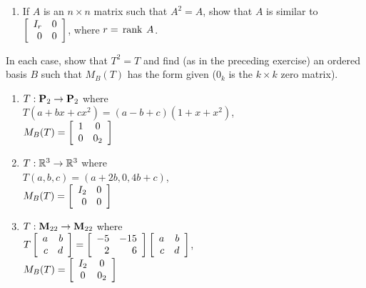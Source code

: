 \begin{multicols}{2}
\begin{ex}
\begin{enumerate}[label={\alph*.}]
\item If $A$ is an $n \times n$ matrix such that $A^{2} = A$, show that $A$ is similar to $\left[ \begin{array}{rr} I_r & 0 \\ 0 & 0 \end{array} \right]$, where $r = \thinspace\operatorname{rank \medspace}A$. 

\end{enumerate}
\end{ex}

\begin{ex}
In each case, show that $T^{2} = T$ and find (as in the preceding exercise) an ordered basis $B$ such that $M_{B}(T)$ has the form given ($0_{k}$ is the $k \times k$ zero matrix).


\begin{enumerate}[label={\alph*.}]
\item $T : \textbf{P}_2 \to \textbf{P}_2$ where\\ $T(a + bx + cx^2) = (a - b + c)(1 + x + x^2)$, \\ $M_B(T) = \left[ \begin{array}{cc} 1 & 0 \\ 0 & 0_2 \end{array} \right]$


\item $T : \mathbb{R}^3 \to \mathbb{R}^3$ where \\$T(a, b, c) = (a + 2b, 0, 4b + c)$, \\ $M_B(T) = \left[ \begin{array}{rr} I_2 & 0 \\ 0 & 0 \end{array} \right]$


\item $T : \textbf{M}_{22} \to \textbf{M}_{22}$ where \\$T\left[ \begin{array}{rr} a & b \\ c & d \end{array} \right] = \left[ \begin{array}{rr} -5 & -15 \\ 2 & 6 \end{array} \right]\left[ \begin{array}{rr} a & b \\ c & d \end{array} \right]$, \\ $M_B(T) = \left[ \begin{array}{cc} I_2 & 0 \\ 0 & 0_2 \end{array} \right]$



\end{enumerate}
\end{ex}
\end{multicols}

